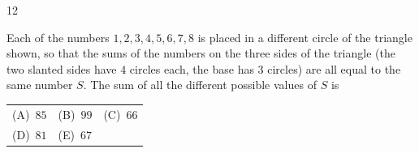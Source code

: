 \documentclass[11pt]{article}
\makeatletter
\newenvironment{probbox}[2]{\begin{probboxT}{#1}{#2}}{\end{probboxT}}
\newcommand{\choicesII}[5]{\par\smallskip\noindent
  \begin{tabularx}{\linewidth}{@{}XXX@{}}(A)\ #1&(B)\ #2&(C)\ #3\\(D)\ #4&(E)\ #5&\end{tabularx}\par}
\makeatother
\begin{document}
\begin{probbox}{12}{\relax}
\begin{minipage}[t]{0.63\linewidth}
Each of the numbers $1, 2, 3, 4, 5, 6, 7, 8$ is placed in a different circle of the triangle shown, so that the sums of the numbers on the
three sides of the triangle (the two slanted sides have $4$ circles each, the base has $3$ circles) are all equal to the same number $S$.
The sum of all the different possible values of $S$ is
\choicesII{$85$}{$99$}{$66$}{$81$}{$67$}
\end{minipage}\hfill
\begin{minipage}[t]{0.33\linewidth}\vspace{0pt}\centering
\lgaTriEight{}{}{}{}{}{}{}{}
\end{minipage}
\end{probbox}
\end{document}
